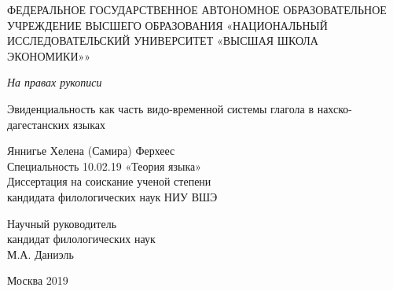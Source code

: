 
\begin{titlepage}
\begin{center}\begin{large}
ФЕДЕРАЛЬНОЕ ГОСУДАРСТВЕННОЕ АВТОНОМНОЕ ОБРАЗОВАТЕЛЬНОЕ УЧРЕЖДЕНИЕ ВЫСШЕГО ОБРАЗОВАНИЯ «НАЦИОНАЛЬНЫЙ ИССЛЕДОВАТЕЛЬСКИЙ УНИВЕРСИТЕТ «ВЫСШАЯ ШКОЛА ЭКОНОМИКИ»»
\end{large}

\begin{flushright}{\textit{На правах рукописи}} \end{flushright}

\vspace{2cm}

\begin{huge}
Эвиденциальность как часть видо-временной системы глагола в нахско-дагестанских языках
\end{huge}

\vspace{1cm}

\begin{large}
Яннигье Хелена (Самира) Ферхеес\\
Специальность 10.02.19 «Теория языка»\\
Диссертация на соискание ученой степени\\
кандидата филологических наук НИУ ВШЭ

\vspace{2cm}

\begin{flushright}{Научный руководитель \\
кандидат филологических наук\\
М.А. Даниэль} \end{flushright}

\vspace{1cm}

Москва 2019


\end{large}
\end{center}
\end{titlepage}
